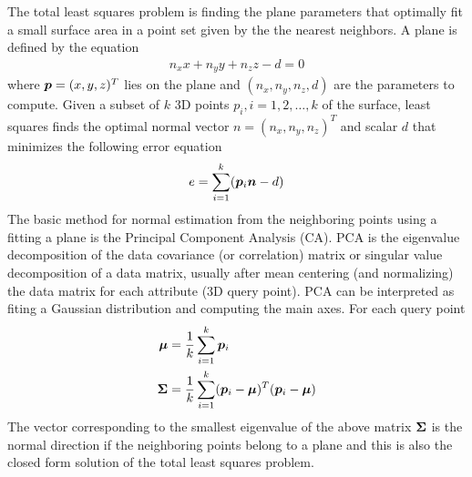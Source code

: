 \documentclass[twocolumn,oneside]{book}
\newcommand{\V}[1]{\vector{#1}}  %
\newcommand{\M}[1]{\V{#1}}    %
\begin{document}
\begin{itemize}
  The total least squares problem is finding the plane parameters
  that optimally fit a small surface area in a point set given by the 
  the nearest neighbors. A plane is defined by the equation
\begin{align*}
  n_x x + n_y y + n_z z - d = 0
\end{align*}  
  where $\V p = (x, y, z)^T$ lies on the plane and $(n_x, n_y, n_z,
  d)$ are the parameters to compute. Given a subset of $k$ 3D points
  $p_i, i = 1, 2, \ldots, k$ of the surface, least squares finds the
  optimal normal vector $n = (n_x, n_y, n_z )^T$ and scalar $d$ that
  minimizes the following error equation
\begin{align}
  e = \sum_{i=1}^k (\V p_i \V n - d)\label{eq:normal}
\end{align}  
  The basic method for normal estimation from the neighboring points
  using a fitting a plane is the Principal Component Analysis (CA).
  PCA is the eigenvalue decomposition of the data covariance (or
  correlation) matrix or singular value decomposition of a data
  matrix, usually after mean centering (and normalizing) the data
  matrix for each attribute (3D query point). PCA can be interpreted
  as fiting a Gaussian distribution and computing the main axes. For
  each query point
\begin{align*}
  \V \mu    & = \frac{1}{k} \sum_{i=1}^{k} \V p_i \\
  \M \Sigma & = \frac{1}{k} \sum_{i=1}^{k} (\V p_i - \V \mu)^T(\V p_i - \V \mu)
\end{align*}
  The vector corresponding to the smallest eigenvalue of the above
  matrix $\M \Sigma$ is the normal direction if the neighboring
  points belong to a plane and this is also the closed form
  solution of the total least squares problem.


\end{itemize}
\end{document}
